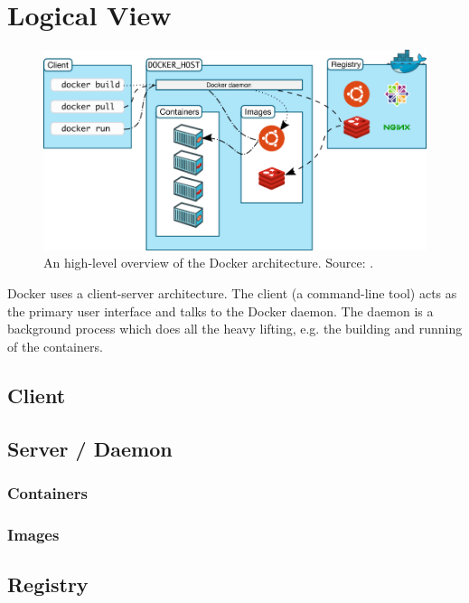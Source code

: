 
\section{Logical View}
\label{sec:viewlogical}


\begin{figure}[H]
\caption{An high-level overview of the Docker architecture. Source: \cite{dockerarchi}.}
\centering
\includegraphics[scale=0.4]{4-softwarearch/images/architecture.png}
\end{figure}
Docker uses a client-server architecture. The client (a command-line tool) acts as the primary user interface and talks to the Docker daemon. The daemon is a background process which does all the heavy lifting, e.g. the building and running of the containers.


\subsection{Client}

\subsection{Server / Daemon}

\subsubsection{Containers}
\subsubsection{Images}


\subsection{Registry}